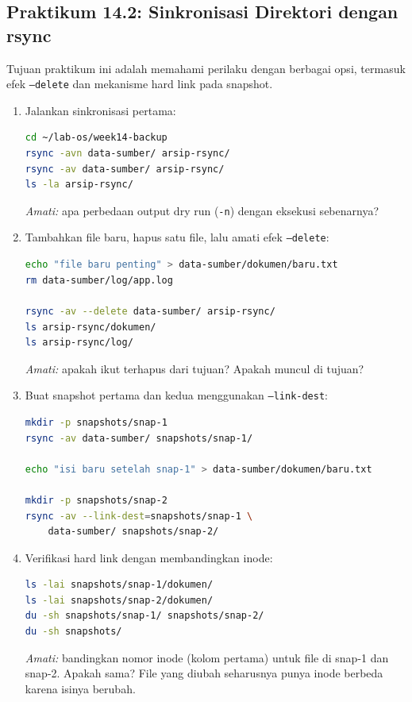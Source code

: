 \subsection*{Praktikum 14.2: Sinkronisasi Direktori dengan rsync}

Tujuan praktikum ini adalah memahami perilaku  dengan berbagai opsi,
termasuk efek \texttt{--delete} dan mekanisme hard link pada snapshot.

\begin{enumerate}
    \item Jalankan sinkronisasi pertama:
\begin{lstlisting}[language=bash, caption={Sinkronisasi pertama dengan rsync}]
cd ~/lab-os/week14-backup
rsync -avn data-sumber/ arsip-rsync/
rsync -av data-sumber/ arsip-rsync/
ls -la arsip-rsync/
\end{lstlisting}
    \textit{Amati:} apa perbedaan output dry run (\texttt{-n}) dengan eksekusi
    sebenarnya?

    \item Tambahkan file baru, hapus satu file, lalu amati efek \texttt{--delete}:
\begin{lstlisting}[language=bash, caption={Mengamati efek --delete pada rsync}]
echo "file baru penting" > data-sumber/dokumen/baru.txt
rm data-sumber/log/app.log

rsync -av --delete data-sumber/ arsip-rsync/
ls arsip-rsync/dokumen/
ls arsip-rsync/log/
\end{lstlisting}
    \textit{Amati:} apakah  ikut terhapus dari tujuan? Apakah
     muncul di tujuan?

    \item Buat snapshot pertama dan kedua menggunakan \texttt{--link-dest}:
\begin{lstlisting}[language=bash, caption={Membuat dua snapshot berbasis hard link}]
mkdir -p snapshots/snap-1
rsync -av data-sumber/ snapshots/snap-1/

echo "isi baru setelah snap-1" > data-sumber/dokumen/baru.txt

mkdir -p snapshots/snap-2
rsync -av --link-dest=snapshots/snap-1 \
    data-sumber/ snapshots/snap-2/
\end{lstlisting}

    \item Verifikasi hard link dengan membandingkan inode:
\begin{lstlisting}[language=bash, caption={Verifikasi hard link antar snapshot}]
ls -lai snapshots/snap-1/dokumen/
ls -lai snapshots/snap-2/dokumen/
du -sh snapshots/snap-1/ snapshots/snap-2/
du -sh snapshots/
\end{lstlisting}
    \textit{Amati:} bandingkan nomor inode (kolom pertama) untuk file 
    di snap-1 dan snap-2. Apakah sama? File \file{baru.txt} yang diubah
    seharusnya punya inode berbeda karena isinya berubah.


\end{enumerate}
